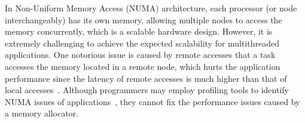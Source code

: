 In Non-Uniform Memory Access (NUMA) architecture, each processor (or node interchangeably) has its own memory, allowing multiple nodes to access the memory concurrently, which is a scalable hardware design. 
However, it is extremely challenging to achieve the expected scalability for multithreaded applications. One notorious issue is caused by remote accesses that a task accesses the memory located in a remote node, which hurts the application performance since the latency of remote accesses is much higher than that of local accesses~\cite{Blagodurov:2011:CNC:2002181.2002182}. 
Although programmers may employ profiling tools to identify NUMA issues of applications~\cite{Intel:VTune, Memphis, Lachaize:2012:MMP:2342821.2342826, XuNuma, NumaMMA, 7847070, NumaPerf}, they cannot fix the performance issues caused by a memory allocator.


